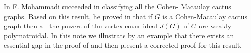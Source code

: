 \documentclass[sn-mathphys,Numbered]{sn-jnl}%
\theoremstyle{thmstyleone}%
\theoremstyle{thmstyletwo}%
\theoremstyle{thmstylethree}%
\begin{document}
%
%
%




 \maketitle

  In \cite{M}  F. Mohammadi succeeded in classifying all the Cohen-
Macaulay cactus graphs.  Based on this result, he proved in \cite[Theorem 4.3]{M} that if $G$ is a Cohen-Macaulay  cactus graph then all the powers of the vertex cover ideal $J(G)$ of $G$ are weakly polymatroidal. In this note we  illustrate by an example that there exists an essential gap in the proof of
  \cite[Theorem 4.3]{M} and then present a corrected proof for this result.
\end{document}
